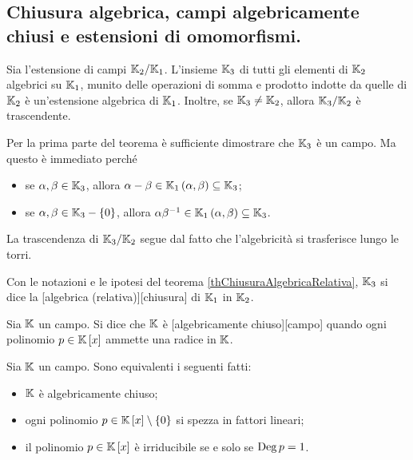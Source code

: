 \subsection{Chiusura algebrica, campi algebricamente chiusi e estensioni di omomorfismi.}\label{ChiusureAlgebricheECampiAlgebricamenteChiusi}
\begin{Theorem}\label{thChiusuraAlgebricaRelativa}
	Sia l'estensione di campi $\mathbb{K}_2/\mathbb{K}_1$. L'insieme $\mathbb{K}_3$ di tutti gli elementi di $\mathbb{K}_2$ algebrici su $\mathbb{K}_1$, munito delle operazioni di somma e prodotto indotte da quelle di $\mathbb{K}_2$ \`e un'estensione algebrica di $\mathbb{K}_1$. Inoltre, se $\mathbb{K}_3 \neq \mathbb{K}_2$, allora $\mathbb{K}_3/\mathbb{K}_2$ \`e trascendente.
\end{Theorem}
\Proof Per la prima parte del teorema \`e sufficiente dimostrare che $\mathbb{K}_3$ \`e un campo. Ma questo \`e immediato perch\'e
\begin{itemize}
	\item se $\alpha, \beta \in \mathbb{K}_3$, allora $\alpha - \beta \in \mathbb{K}_1 \left ( \alpha, \beta \right ) \subseteq \mathbb{K}_3$;
	\item se $\alpha, \beta \in \mathbb{K}_3 - \lbrace 0 \rbrace$, allora $\alpha\beta^{-1} \in \mathbb{K}_1 \left ( \alpha, \beta \right ) \subseteq \mathbb{K}_3$.
\end{itemize}
\par La trascendenza di $\mathbb{K}_3/\mathbb{K}_2$ segue dal fatto che l'algebricit\`a si trasferisce lungo le torri. \EndProof
\begin{Definition}
	Con le notazioni e le ipotesi del teorema \ref{thChiusuraAlgebricaRelativa}, $\mathbb{K}_3$ si dice la [algebrica (relativa)][chiusura] di $\mathbb{K}_1$ in $\mathbb{K}_2$.
\end{Definition}
\begin{Definition}
	Sia $\mathbb{K}$ un campo. Si dice che $\mathbb{K}$ \`e [algebricamente chiuso][campo] quando ogni polinomio $p \in \mathbb{K} \left [ x \right ]$ ammette una radice in $\mathbb{K}$.
\end{Definition}
\begin{Theorem}
	Sia $\mathbb{K}$ un campo. Sono equivalenti i seguenti fatti:
	\begin{itemize}
		\item $\mathbb{K}$ \`e algebricamente chiuso;
		\item ogni polinomio $p \in \mathbb{K} \left [ x \right ] \setminus \lbrace 0 \rbrace$ si spezza in fattori lineari;
		\item il polinomio $p \in \mathbb{K} \left [ x \right ]$ \`e irriducibile se e solo se $\operatorname{Deg}{p} = 1$.
	\end{itemize}
\end{Theorem}
